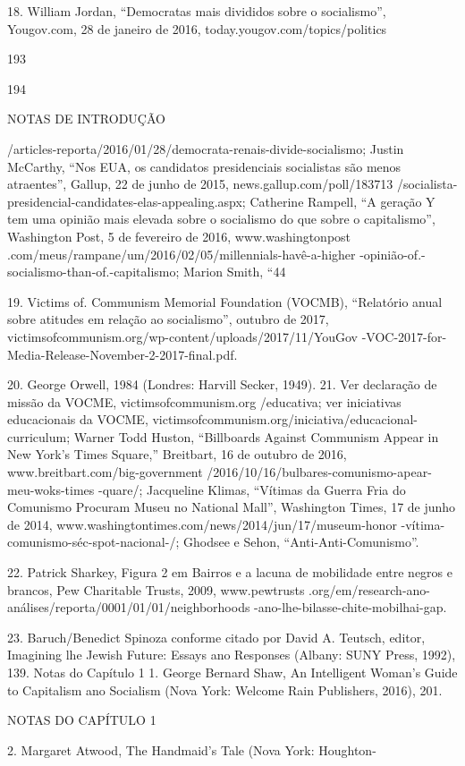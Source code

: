  \par 
18. William Jordan, “Democratas mais divididos sobre o socialismo”, Yougov.com, {\color{blue}28} de janeiro de 2016, today.yougov.com/topics/politics
 \par 
193
 \par 
194
 \par 
NOTAS DE INTRODUÇÃO
 \par 
/articles-reporta/2016/01/28/democrata-renais-divide-socialismo; Justin McCarthy, “Nos EUA, os candidatos presidenciais socialistas são menos atraentes”, Gallup, {\color{blue}22} de junho de 2015, news.gallup.com/poll/183713 /socialista-presidencial-candidates-elas-appealing.aspx; Catherine Rampell, “A geração Y tem uma opinião mais elevada sobre o socialismo do que sobre o capitalismo”, Washington Post, {\color{blue}5} de fevereiro de 2016, www.washingtonpost .com/meus/rampane/um/2016/02/05/millennials-havê-a-higher -opinião-of.-socialismo-than-of.-capitalismo; Marion Smith, “44%
 \par 
19. Victims of. Communism Memorial Foundation (VOCMB), “Relatório anual sobre atitudes em relação ao socialismo”, outubro de 2017, victimsofcommunism.org/wp-content/uploads/2017/11/YouGov -VOC-2017-for-Media-Release-November-2-2017-final.pdf.
 \par 
20. George Orwell, 1984 (Londres: Harvill Secker, 1949). {\color{blue}21}. Ver declaração de missão da VOCME, victimsofcommunism.org /educativa; ver iniciativas educacionais da VOCME, victimsofcommunism.org/iniciativa/educacional-curriculum; Warner Todd Huston, “Billboards Against Communism Appear in New York’s Times Square,” Breitbart, {\color{blue}16} de outubro de 2016, www.breitbart.com/big-government /2016/10/16/bulbares-comunismo-apear-meu-woks-times -quare/; Jacqueline Klimas, “Vítimas da Guerra Fria do Comunismo Procuram Museu no National Mall”, Washington Times, {\color{blue}17} de junho de 2014, www.washingtontimes.com/news/2014/jun/17/museum-honor -vítima-comunismo-séc-spot-nacional-/; Ghodsee e Sehon, “Anti-Anti-Comunismo”.
 \par 
22. Patrick Sharkey, Figura {\color{blue}2} em Bairros e a lacuna de mobilidade entre negros e brancos, Pew Charitable Trusts, 2009, www.pewtrusts .org/em/research-ano-análises/reporta/0001/01/01/neighborhoods -ano-lhe-bilasse-chite-mobilhai-gap.
 \par 
23. Baruch/Benedict Spinoza conforme citado por David A. Teutsch, editor, Imagining lhe Jewish Future: Essays ano Responses (Albany: SUNY Press, 1992), {\color{blue}139}. Notas do Capítulo {\color{blue}1} 1. George Bernard Shaw, An Intelligent Woman's Guide to Capitalism ano Socialism (Nova York: Welcome Rain Publishers, 2016), {\color{blue}201}.
 \par 
NOTAS DO CAPÍTULO {\color{blue}1}
 \par 
2. Margaret Atwood, The Handmaid’s Tale (Nova York: Houghton-
 \par 

